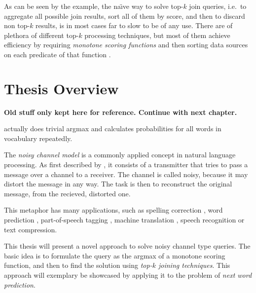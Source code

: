 As can be seen by the example, the na\"{\i}ve way to solve top-$k$ join
queries, i.e.\ to aggregate all possible join results, sort all of them by
score, and then to discard non top-$k$ results, is in most cases far to
slow to be of any use.
There are of plethora of different top-$k$ processing techniques, but most
of them achieve efficiency by requiring \emph{monotone scoring functions} and
then sorting data sources on each predicate of that function
\parencite{Ilyas2008}.


\section{Thesis Overview}


\clearpage

\textbf{Old stuff only kept here for reference. Continue with next chapter.}

\begin{draft}
\textcite{Bickel2005} actually does trivial argmax and calculates probabilities
for all words in vocabulary repeatedly.
\end{draft}

The \emph{noisy channel model} is a commonly applied concept in natural language
processing.
As first described by \textcite{Shannon1948}, it consists of a transmitter that
tries to pass a message over a channel to a receiver.
The channel is called noisy, because it may distort the message in any way.
The task is then to reconstruct the original message, from the recieved,
distorted one.

This metaphor has many applications, such as spelling correction
\parencite{JurafskyMartin2009,Manning2008,Kernighan1990,Mays1991},
word prediction \parencite{Bickel2005}, part-of-speech tagging
\parencite{Church1988}, machine translation \parencite{Brown1990}, speech
recognition or text compression.

This thesis will present a novel approach to solve noisy channel type queries.
The basic idea is to formulate the query as the argmax of a monotone scoring
function, and then to find the solution using \emph{top-$k$ joining techniques}.
This approach will exemplary be showcased by applying it to the problem of
\emph{next word prediction}.

